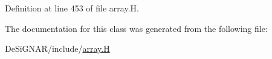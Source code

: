 Definition at line 453 of file array.\+H.



The documentation for this class was generated from the following file\+:\begin{DoxyCompactItemize}
\item 
De\+Si\+G\+N\+A\+R/include/\hyperlink{array_8_h}{array.\+H}\end{DoxyCompactItemize}
